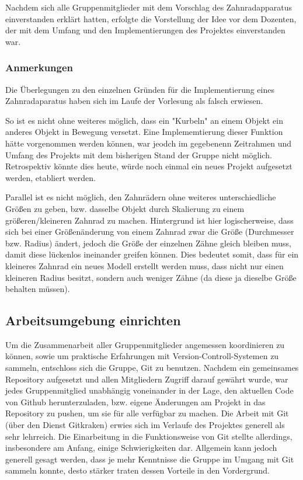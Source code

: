 \documentclass{article}
\begin{document}
Nachdem sich alle Gruppenmitglieder mit dem Vorschlag des Zahnradapparatus einverstanden erklärt hatten, erfolgte die Vorstellung der Idee vor dem Dozenten, der mit dem Umfang und den Implementierungen des Projektes einverstanden war. 



\subsubsection{Anmerkungen}
Die Überlegungen zu den einzelnen Gründen für die Implementierung eines Zahnradaparatus haben sich im Laufe der Vorlesung als falsch erwiesen. 

So ist es nicht ohne weiteres möglich, dass ein "Kurbeln" an einem Objekt ein anderes Objekt in Bewegung versetzt. 
Eine Implememtierung dieser Funktion hätte vorgenommen werden können, war jeodch im gegebenenn Zeitrahmen und Umfang des Projekts mit dem bisherigen Stand der Gruppe nicht möglich. 
Retrospektiv könnte dies heute, würde noch einmal ein neues Projekt aufgesetzt werden, etabliert werden. 

Parallel ist es nicht möglich, den Zahnrädern ohne weiteres unterschiedliche Größen zu geben, bzw. dasselbe Objekt durch Skalierung zu einem größeren/kleineren Zahnrad zu machen. 
Hintergrund ist hier logischerweise, dass sich bei einer Größenänderung von einem Zahnrad zwar die Größe (Durchmesser bzw. Radius) ändert, jedoch die Größe der einzelnen Zähne gleich bleiben muss, damit diese lückenlos ineinander greifen können. 
Dies bedeutet somit, dass für ein kleineres Zahnrad ein neues Modell erstellt werden muss, dass nicht nur einen kleineren Radius besitzt, sondern auch weniger Zähne (da diese ja dieselbe Größe behalten müssen). 



\subsection{Arbeitsumgebung einrichten}
Um die Zusammenarbeit aller Gruppenmitglieder angemessen koordinieren zu können, sowie um praktische Erfahrungen mit Version-Controll-Systemen zu sammeln, entschloss sich die Gruppe, Git zu benutzen. 
Nachdem ein gemeinsames Repository aufgesetzt und allen Mitgliedern Zugriff darauf gewährt wurde, war jedes Gruppenmitglied unabhängig voneinander in der Lage, den aktuellen Code von Github herunterzuladen, bzw. eigene Änderungen am Projekt in das Repository zu pushen, um sie für alle verfügbar zu machen. 
Die Arbeit mit Git (über den Dienst Gitkraken) erwies sich im Verlaufe des Projektes generell als sehr lehrreich. 
Die Einarbeitung in die Funktionsweise von Git stellte allerdings, insbesondere am Anfang, einige Schwierigkeiten dar. 
Allgemein kann jedoch generell gesagt werden, dass je mehr Kenntnisse die Gruppe im Umgang mit Git sammeln konnte, desto stärker traten dessen Vorteile in den Vordergrund.  
\end{document}
